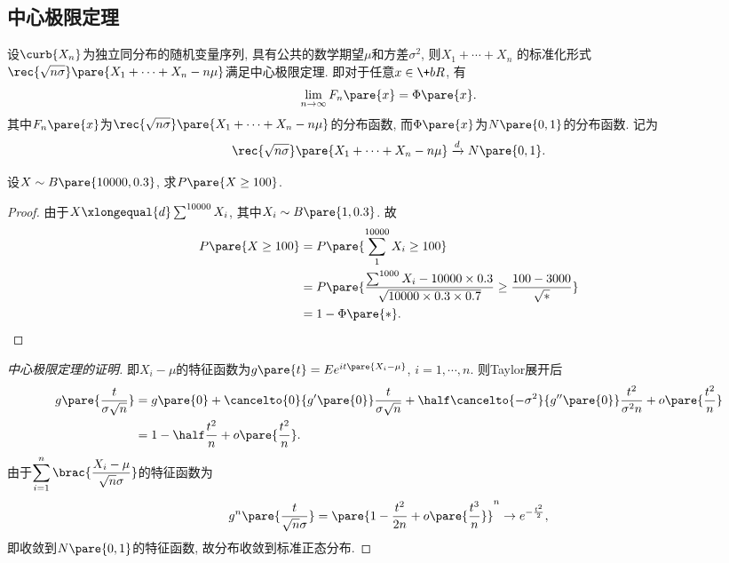 \documentclass[../Statistics.tex]{subfiles}
\begin{document}

\subsection{中心极限定理} %
\label{sub:中心极限定理}

\begin{theorem}
    设$\curb{X_n}$为独立同分布的随机变量序列, 具有公共的数学期望$\mu$和方差$\sigma^2$, 则$X_1+\cdots+X_n$
    的标准化形式$\displaystyle \rec{\sqrt{n\sigma}}\pare{X_1 + \cdots + X_n - n\mu}$满足中心极限定理. 即对于任意$x\in \+bR$, 有
    \[ \lim_{n\rightarrow \infty} F_n\pare{x} = \Phi\pare{x}. \]
    其中$F_n\pare{x}$为$\displaystyle \rec{\sqrt{n\sigma}}\pare{X_1 + \cdots + X_n - n\mu}$的分布函数, 而$\Phi\pare{x}$为$N\pare{0,1}$的分布函数. 记为
    \[ \rec{\sqrt{n\sigma}}\pare{X_1 + \cdots + X_n - n\mu} \xrightarrow{d} N\pare{0,1}. \]
\end{theorem}
\begin{sample}
    \begin{ex}
        设$X\sim B\pare{10000, 0.3}$, 求$P\pare{X\ge 100}$.
    \end{ex}
    \begin{proof}
        由于$X \xlongequal{d} \sum^{10000}X_i$, 其中$X_i \sim B\pare{1,0.3}$. 故
        \begin{align*}
            P\pare{X\ge 100} &= P\pare{\sum_1^{10000}X_i \ge 100} \\
            &= P \pare{\frac{\sum^{1000}X_i - 10000\times 0.3}{\sqrt{10000\times 0.3 \times 0.7}} \ge \frac{100 - 3000}{\sqrt{*}}} \\
            &= 1 - \Phi\pare{*}. \qedhere
        \end{align*}
    \end{proof}
\end{sample}
\begin{proof}[中心极限定理的证明]
    即$X_i - \mu$的特征函数为$g\pare{t} = Ee^{it\pare{X_i - \mu}}$, $i=1,\cdots, n$. 则Taylor展开后
    \begin{align*}
        g\pare{\frac{t}{\sigma\sqrt{n}}} &= g\pare{0} + \cancelto{0}{g'\pare{0}} \frac{t}{\sigma\sqrt{n}} + \half  \cancelto{-\sigma^2}{g''\pare{0}} \frac{t^2}{\sigma^2 n} + o\pare{\frac{t^2}{n}} \\
        &= 1 - \half \frac{t^2}{n} + o\pare{\frac{t^2}{n}}.
    \end{align*}
    由于$\displaystyle \sum_{i=1}^n \brac{\frac{X_i - \mu}{\sqrt{n}\sigma}}$的特征函数为
    \[ g^n\pare{\frac{t}{\sqrt{n}\sigma}}  = \pare{1 - \frac{t^2}{2n} + o\pare{\frac{t^3}{n}}}^n \rightarrow e^{-\frac{t^2}{2}}, \]
    即收敛到$N\pare{0,1}$的特征函数, 故分布收敛到标准正态分布.
\end{proof}
\end{document}
